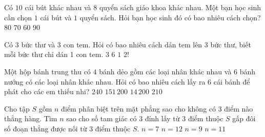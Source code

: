 

\begin{ex}%
	Có $10$  cái bút khác nhau và $8$ quyển sách giáo khoa khác nhau. Một bạn học sinh cần chọn $1$ cái bút và $1$ quyển sách. Hỏi bạn học sinh đó có bao nhiêu cách chọn?
	 \choice
		 {\True $80$}
		{$70$} 
		{$60$} 
		{$90$} 
\end{ex}

\begin{ex}%
	Có $3$ bức thư và $3$ con tem. Hỏi có bao nhiêu cách dán tem lên $3$ bức thư, biết mỗi bức thư chỉ  dán 1 con tem.
	\choice 
		 {$3$}
		{\True  $6$}
		{$1$} 
		 {$2!$}
\end{ex}

\begin{ex}%
	Một hộp bánh trung thu có $4$ bánh dẻo gồm các loại nhân khác  nhau và $6$ bánh nướng có các loại nhân khác nhau. Hỏi có bao nhiêu cách lấy ra $6$ cái bánh để phát cho các em thiếu nhi?
	\choice 
		 {$240$}
		{$151\,200$} 
		 {$14\,200$}
		{\True $210$} 
\end{ex}

\begin{ex}%
	Cho tập  $S$ gồm $n$ điểm phân biệt trên mặt phẳng sao cho không có $3$ điểm nào thẳng hàng. Tìm $n$ sao cho số tam giác có $3$ đỉnh lấy từ $3$ điểm thuộc $S$ gấp đôi số đoạn thẳng được nối từ $3$ điểm thuộc $S$.
	 \choice
		 {$n=7$}
		{$n=12$} 
		 {$n=9$}
		 {\True $n=11$}
\end{ex}

